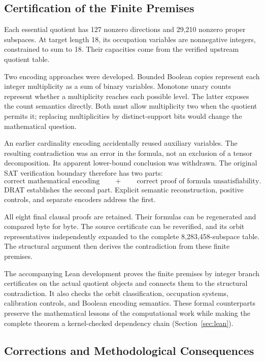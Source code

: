 \subsection{Certification of the Finite Premises}\label{route:certificates}

Each essential quotient has 127 nonzero directions and 29,210
nonzero proper subspaces. At target length 18, its occupation
variables are nonnegative integers, constrained to sum to 18.
Their capacities come from the verified upstream quotient table.

Two encoding approaches were developed. Bounded Boolean copies
represent each integer multiplicity as a sum of binary variables.
Monotone unary counts represent whether a multiplicity reaches
each possible level. The latter exposes the count semantics
directly. Both must allow multiplicity two when the quotient
permits it; replacing multiplicities by distinct-support bits
would change the mathematical question.

An earlier cardinality encoding accidentally reused auxiliary
variables. The resulting contradiction was an error in the
formula, not an exclusion of a tensor decomposition. Its apparent
lower-bound conclusion was withdrawn. The original SAT verification
boundary therefore has two parts:
\[
 \text{correct mathematical encoding}
 \qquad+\qquad
 \text{correct proof of formula unsatisfiability}.
\]
DRAT establishes the second part. Explicit semantic reconstruction,
positive controls, and separate encoders address the first.

All eight final clausal proofs are retained. Their formulas can
be regenerated and compared byte for byte. The source certificate
can be reverified, and its orbit representatives independently
expanded to the complete 8,283,458-subspace table. The structural
argument then derives the contradiction from these finite premises.

The accompanying Lean development proves the finite premises by integer
branch certificates on the actual quotient objects and connects them to
the structural contradiction. It also checks the orbit classification,
occupation systems, calibration controls, and Boolean encoding semantics.
These formal counterparts preserve the mathematical lessons of the
computational work while making the complete theorem a kernel-checked
dependency chain (Section~\ref{sec:lean}).

\subsection{Corrections and Methodological Consequences}\label{route:corrections}

